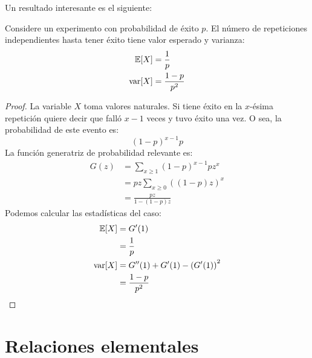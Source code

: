   Un resultado interesante es el siguiente:
  \begin{theorem}
     \label{theo:repeat}
     Considere un experimento con probabilidad de éxito \(p\).
     El número de repeticiones independientes hasta tener éxito
     tiene valor esperado y varianza:
     \begin{align*}
       \operatorname{\mathbb{E}}[X]
         &= \frac{1}{p} \\
       \operatorname{var}[X]
         &= \frac{1 - p}{p^2}
     \end{align*}
  \end{theorem}
  \begin{proof}
    La variable \(X\) toma valores naturales.
    Si tiene éxito en la \(x\)\nobreakdash-ésima repetición
    quiere decir que falló \(x - 1\) veces y tuvo éxito una vez.
    O sea,
    la probabilidad de este evento es:
    \begin{equation*}
      (1 - p)^{x - 1} p
    \end{equation*}
    La función generatriz de probabilidad relevante es:
    \begin{align*}
      G(z)
        &= \sum_{x \ge 1} (1 - p)^{x - 1} p z^x \\
        &= p z \sum_{x \ge 0} ((1 - p) z)^x \\
        &= \frac{p z}{1 - (1 - p) z}
    \end{align*}
    Podemos calcular las estadísticas del caso:
    \begin{align*}
      \operatorname{\mathbb{E}}[X]
        &= G'(1) \\
        &= \frac{1}{p} \\
      \operatorname{var}[X]
        &= G''(1) + G'(1) - \left( G'(1) \right)^2 \\
        &= \frac{1 - p}{p^2}
    \end{align*}
  \end{proof}

\section{Relaciones elementales}
\label{sec:elementales-probabilidades}


